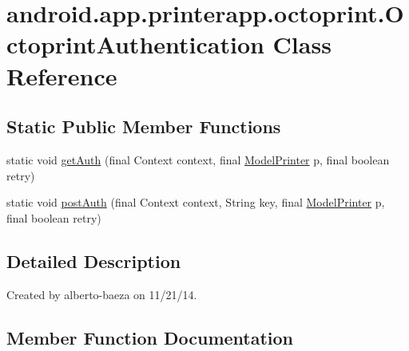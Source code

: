 \hypertarget{classandroid_1_1app_1_1printerapp_1_1octoprint_1_1_octoprint_authentication}{}\section{android.\+app.\+printerapp.\+octoprint.\+Octoprint\+Authentication Class Reference}
\label{classandroid_1_1app_1_1printerapp_1_1octoprint_1_1_octoprint_authentication}
\subsection*{Static Public Member Functions}
\begin{DoxyCompactItemize}
\item 
static void \hyperlink{classandroid_1_1app_1_1printerapp_1_1octoprint_1_1_octoprint_authentication_a66f318d3f8096f25022b7fcc7f992a5c}{get\+Auth} (final Context context, final \hyperlink{classandroid_1_1app_1_1printerapp_1_1model_1_1_model_printer}{Model\+Printer} p, final boolean retry)
\item 
static void \hyperlink{classandroid_1_1app_1_1printerapp_1_1octoprint_1_1_octoprint_authentication_a22720210b195487b29f06803d582c980}{post\+Auth} (final Context context, String key, final \hyperlink{classandroid_1_1app_1_1printerapp_1_1model_1_1_model_printer}{Model\+Printer} p, final boolean retry)
\end{DoxyCompactItemize}


\subsection{Detailed Description}
Created by alberto-\/baeza on 11/21/14. 

\subsection{Member Function Documentation}
\mbox{\label{classandroid_1_1app_1_1printerapp_1_1octoprint_1_1_octoprint_authentication_a66f318d3f8096f25022b7fcc7f992a5c}} 
